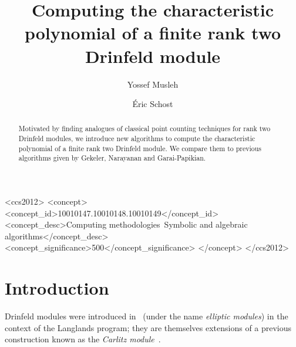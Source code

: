 \documentclass[sigconf]{acmart}
\begin{document}
\title{Computing the characteristic polynomial of a finite rank two Drinfeld module}

\author{Yossef Musleh}

\author{\'Eric Schost}



\begin{abstract}
  Motivated by finding analogues of classical point counting
  techniques for rank two Drinfeld modules, we introduce new
  algorithms to compute the characteristic polynomial of a finite rank
  two Drinfeld module. We compare them to previous algorithms given by Gekeler,
 Narayanan and Garai-Papikian.
\end{abstract}

\begin{CCSXML}
<ccs2012>
<concept>
<concept_id>10010147.10010148.10010149</concept_id>
<concept_desc>Computing methodologies~Symbolic and algebraic algorithms</concept_desc>
<concept_significance>500</concept_significance>
</concept>
</ccs2012>
\end{CCSXML}



\maketitle


\section{Introduction}

Drinfeld modules were introduced in~\cite{Drinfeld74} (under the 
name {\em elliptic modules}) in the context of the Langlands program;
they are themselves extensions of a previous construction known 
as the {\em Carlitz module}~\cite{Carlitz35}.
\end{document}
